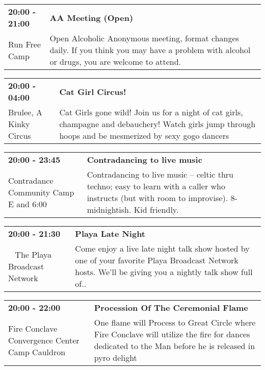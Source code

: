 \begin{tabular}{ p{1in} p{2.2in} }
    \textbf{20:00 - 21:00} & \textbf{AA Meeting (Open)} \\
    Run Free Camp \newline  & Open Alcoholic Anonymous meeting, format changes daily. If you think you may have a problem with alcohol or drugs, you are welcome to attend. \\
    \hline 
\end{tabular}
    
\begin{tabular}{ p{1in} p{2.2in} }
    \textbf{20:00 - 04:00} & \textbf{Cat Girl Circus!} \\
    Brulee, A Kinky Circus \newline  & Cat Girls gone wild! Join us for a night of cat girls, champagne and debauchery! Watch girls jump through hoops and be mesmerized by sexy gogo dancers \\
    \hline 
\end{tabular}
    
\begin{tabular}{ p{1in} p{2.2in} }
    \textbf{20:00 - 23:45} & \textbf{Contradancing to live music} \\
    Contradance Community Camp \newline E  and 6:00 & Contradancing to live music -- celtic thru techno; easy to learn with a caller who instructs (but with room to improvise). 8-midnightish. Kid friendly. \\
    \hline 
\end{tabular}
    
\begin{tabular}{ p{1in} p{2.2in} }
    \textbf{20:00 - 21:30} & \textbf{Playa Late Night} \\
    ~ \newline The Playa Broadcast Network & Come enjoy a live late night talk show hosted by one of your favorite Playa Broadcast Network hosts. We'll be giving you a nightly talk show full of.. \\
    \hline 
\end{tabular}
    
\begin{tabular}{ p{1in} p{2.2in} }
    \textbf{20:00 - 22:00} & \textbf{Procession Of The Ceremonial Flame} \\
    Fire Conclave Convergence \newline Center Camp Cauldron & One flame will Process to Great Circle where Fire Conclave will utilize the fire for dances dedicated to the Man before he is released in pyro delight \\
    \hline 
\end{tabular}
    
